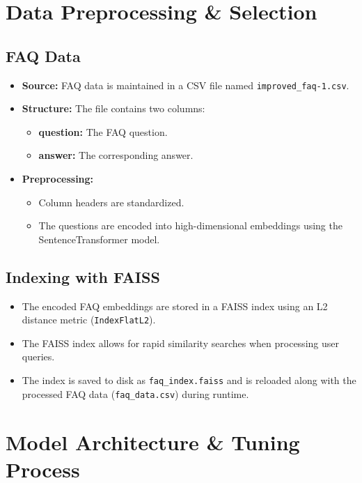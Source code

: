 \documentclass[12pt]{article}
\begin{document}
\section{Data Preprocessing \& Selection}

\subsection{FAQ Data}

\begin{itemize}
    \item \textbf{Source:} FAQ data is maintained in a CSV file named \texttt{improved\_faq-1.csv}.
    \item \textbf{Structure:} The file contains two columns:
    \begin{itemize}
        \item \textbf{question:} The FAQ question.
        \item \textbf{answer:} The corresponding answer.
    \end{itemize}
    \item \textbf{Preprocessing:} 
    \begin{itemize}
        \item Column headers are standardized.
        \item The questions are encoded into high-dimensional embeddings using the SentenceTransformer model.
    \end{itemize}
\end{itemize}

\subsection{Indexing with FAISS}

\begin{itemize}
    \item The encoded FAQ embeddings are stored in a FAISS index using an L2 distance metric (\texttt{IndexFlatL2}).
    \item The FAISS index allows for rapid similarity searches when processing user queries.
    \item The index is saved to disk as \texttt{faq\_index.faiss} and is reloaded along with the processed FAQ data (\texttt{faq\_data.csv}) during runtime.
\end{itemize}

\section{Model Architecture \& Tuning Process}
\end{document}
